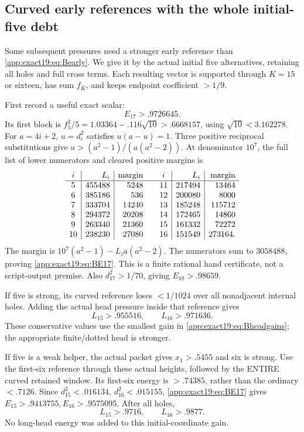 \subsection{Curved early references with the whole initial-five debt}
\label{app:exact19:Bcurvedearly}

Some subsequent pressures need a
stronger early reference than
\eqref{app:exact19:eq:Bearly}.
We give it by the actual initial
five alternatives, retaining all
holes and full cross terms.
Each resulting vector is supported
through \(K=15\) or sixteen,
has sum \(f_K\), and keeps endpoint
coefficient \(>1/9\).

First record a useful exact scalar:
\[
                              E_{17}>.9726645 .
\tag{B19E17}\label{app:exact19:eq:BE17}
\]
Its first block is
\(f_5^2/5=1.03364-.116\sqrt{10}>.6668157\),
using \(\sqrt{10}<3.162278\).
For \(a=4i+2\),
\(u=d_i^2\) satisfies \(u(a-u)=1\).
Three positive reciprocal
substitutions give
\(u>(a^2-1)/(a(a^2-2))\).
At denominator \(10^7\), the full
list of lower numerators and
cleared positive margins is
\[
\begin{array}{c|r|r@{\qquad}c|r|r}
 i&L_i&\text{margin}&i&L_i&\text{margin}\\ \hline
5&455488&5248&11&217494&13464\\
6&385186&536&12&200080&8000\\
7&333704&14240&13&185248&115712\\
8&294372&20208&14&172465&14860\\
9&263340&21360&15&161332&72272\\
10&238230&27080&16&151549&273164 .
\end{array}
\]
The margin is
\(10^7(a^2-1)-L_i a(a^2-2)\).
The numerators sum to \(3058488\),
proving \eqref{app:exact19:eq:BE17}.
This is a finite rational hand
certificate, not a script-output
premise.
Also \(d_{17}^2>1/70\), giving
\(E_{18}>.98659\).

If five is strong, its curved
reference loses \(<1/1024\) over
all nonadjacent internal holes.
Adding the actual head pressure
inside that reference gives
\[
                   L_{15}>.955516,\qquad L_{16}>.971636 .
\]
These conservative values use the
smallest gain in
\eqref{app:exact19:eq:Bheadgains};
the appropriate finite/dotted head
is stronger.

If five is a weak helper, the
actual packet gives \(x_1>.5455\)
and six is strong.
Use the first-six reference through
these actual heights, followed by
the ENTIRE curved retained window.
Its first-six energy is \(>.74385\),
rather than the ordinary \(<.7126\).
Since \(d_{15}^2<.016134\),
\(d_{16}^2<.015155\),
\eqref{app:exact19:eq:BE17} gives
\(E_{15}>.9413755,E_{16}>.9575095\).
After all holes,
\[
                          L_{15}>.9716,\qquad L_{16}>.9877 .
\]
No long-head energy was added to
this initial-coordinate gain.

